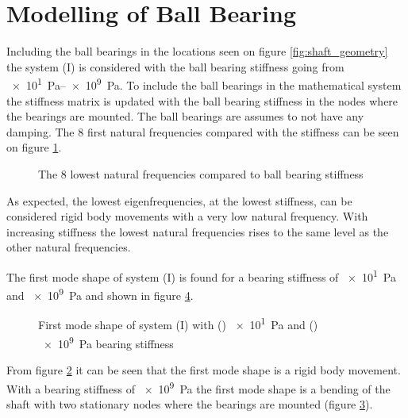 \section{Modelling of Ball Bearing}
Including the ball bearings in the locations seen on figure \ref{fig:shaft_geometry} the system (I) is considered with the ball bearing stiffness going from \SIrange{e1}{e9}{\pascal}.
To include the ball bearings in the mathematical system the stiffness matrix is updated with the ball bearing stiffness in the nodes where the bearings are mounted. The ball bearings are assumes to not have any damping.
The 8 first natural frequencies compared with the stiffness can be seen on figure \ref{fig:ball_bearing_stiffness}.
\begin{figure}[ht]
    \centering
    
    \caption{The 8 lowest natural frequencies compared to ball bearing stiffness}
    \label{fig:ball_bearing_stiffness}
\end{figure}
As expected, the lowest eigenfrequencies, at the lowest stiffness, can be considered rigid body movements with a very low natural frequency. With increasing stiffness the lowest natural frequencies rises to the same level as the other natural frequencies.

The first mode shape of system (I) is found for a bearing stiffness of \SI{e1}{\pascal} and \SI{e9}{\pascal} and shown in figure \ref{fig:mode_shape}.
\begin{figure}[ht]
    \begin{subfigure}[t]{0.45\textwidth}
        \centering
        
        \caption{}
        \label{fig:mode_shape_low_stiffness}
    \end{subfigure}
    \hfill
    \begin{subfigure}[t]{0.45\textwidth}
        \centering
        
        \caption{}
        \label{fig:mode_shape_high_stiffness}
    \end{subfigure}
    \caption{First mode shape of system (I) with () \SI{e1}{\pascal} and () \SI{e9}{\pascal} bearing stiffness}
    \label{fig:mode_shape}
\end{figure}
From figure \ref{fig:mode_shape_low_stiffness} it can be seen that the first mode shape is a rigid body movement. With a bearing stiffness of \SI{e9}{\pascal} the first mode shape is a bending of the shaft with two stationary nodes where the bearings are mounted (figure \ref{fig:mode_shape_high_stiffness}).

